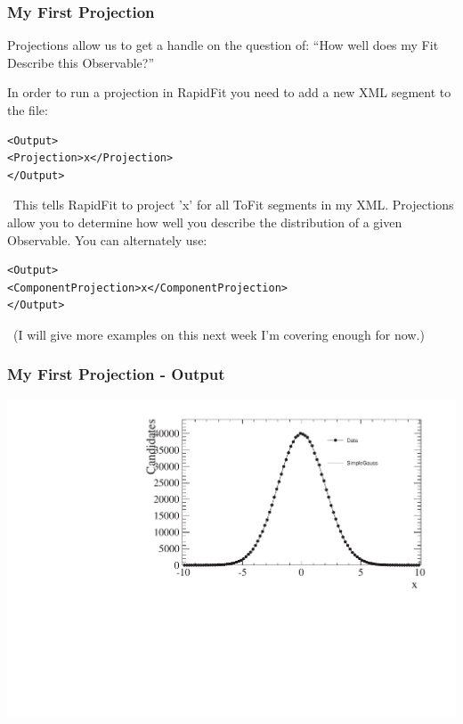 \documentclass{beamer}
\begin{document}
\begin{frame}[fragile]
\frametitle{My First Projection}
Projections allow us to get a handle on the question of:\newline
``How well does my Fit Describe this Observable?''\newline\newline

In order to run a projection in RapidFit you need to add a new XML segment to the file:
\tiny
\begin{lstlisting}[tabsize=8]
<Output>
<Projection>x</Projection>
</Output>
\end{lstlisting}
\normalsize~This tells RapidFit to project 'x' for all ToFit segments in my XML.\newline\newline
Projections allow you to determine how well you describe the distribution of a given Observable.\newline\newline
You can alternately use:
\tiny
\begin{lstlisting}[tabsize=8]
<Output>
<ComponentProjection>x</ComponentProjection>
</Output>
\end{lstlisting}

\small~(I will give more examples on this next week I'm covering enough for now.)

\end{frame}

\begin{frame}
\frametitle{My First Projection - Output}
\includegraphics[width=\textwidth]{./Overlay_x_All_Data.pdf}
\end{frame}
\end{document}
